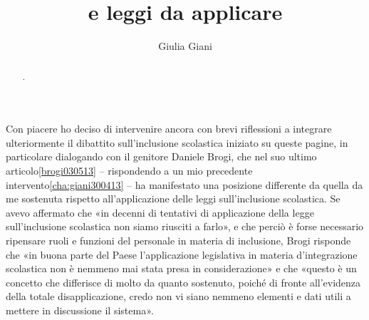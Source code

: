 \author{Giulia Giani}
\title{ e leggi da applicare }
\label{cha:giani140513}
\begin{abstract}
. 
\end{abstract}
\maketitle
Con piacere ho deciso di intervenire ancora con brevi riflessioni a integrare ulteriormente il dibattito sull'inclusione scolastica iniziato su queste pagine, in particolare dialogando con il genitore Daniele Brogi, che nel suo ultimo articolo\ref{brogi030513} – rispondendo a un mio precedente intervento\ref{cha:giani300413} – ha manifestato una posizione differente da quella da me sostenuta rispetto all'applicazione delle leggi sull'inclusione scolastica.
Se avevo affermato che «in decenni di tentativi di applicazione della legge sull'inclusione scolastica non siamo riusciti a farlo», e che perciò è forse necessario ripensare ruoli e funzioni del personale in materia di inclusione, Brogi risponde che «in buona parte del Paese l'applicazione legislativa in materia d'integrazione scolastica non è nemmeno mai stata presa in considerazione» e che «questo è un concetto che differisce di molto da quanto sostenuto, poiché di fronte all'evidenza della totale disapplicazione, credo non vi siano nemmeno elementi e dati utili a mettere in discussione il sistema».

